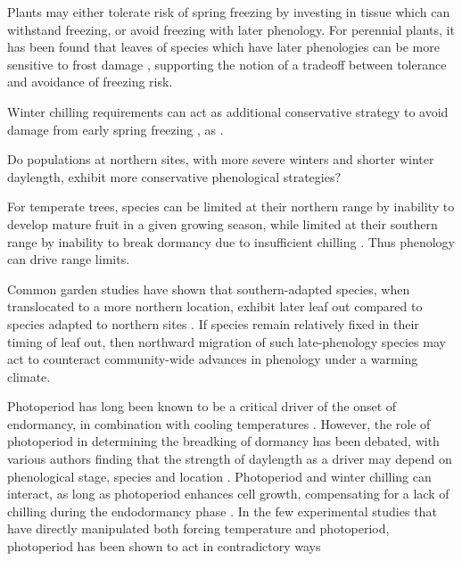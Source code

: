 \documentclass[12pt]{article}
\begin{document}
Plants may either tolerate risk of spring freezing by investing in tissue which can withstand freezing, or avoid freezing with later phenology. For perennial plants, it has been found that leaves of species which have later phenologies can be more sensitive to frost damage \cite{CaraDonna:2014aa}, supporting the notion of a tradeoff between tolerance and avoidance of freezing risk.


Winter chilling requirements can act as additional conservative strategy to avoid damage from early spring freezing \cite{Ghelardini:2010aa}, as .

Do populations at northern sites, with more severe winters and shorter winter daylength, exhibit more conservative phenological strategies?

For temperate trees, species can be limited at their northern range by inability to develop mature fruit in a given growing season, while limited at their southern range by inability to break dormancy due to insufficient chilling \cite{Chuine:2010}. Thus phenology can drive range limits.

Common garden studies have shown that southern-adapted species, when translocated to a more northern location, exhibit later leaf out compared to species adapted to northern sites \cite{Zohner:2014aa}. If species remain relatively fixed in their timing of leaf out, then northward migration of such late-phenology species may act to counteract community-wide advances in phenology under a warming climate. 

Photoperiod has long been known to be a critical driver of the onset of endormancy, in combination with cooling temperatures \cite{Foley:2009aa}. However, the role of photoperiod in determining the breadking of dormancy has been debated, with various authors finding that the strength of daylength as a driver may depend on phenological stage, species and location \cite{Heide:1993}\cite{Falusi:1996aa}. Photoperiod and winter chilling can interact, as long as photoperiod enhances cell growth, compensating for a lack of chilling during the endodormancy phase \cite{Heide:1993b}\cite{Caffarra:2011aa}\cite{Myking:1995}. In the few experimental studies that have directly manipulated both forcing temperature and photoperiod, photoperiod has been shown to act in contradictory ways
\end{document}
